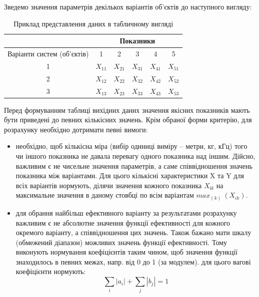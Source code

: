 Зведемо значення параметрів декількох варіантів об’єктів до наступного вигляду:

\begin{table}[!ht]
\centering
\caption{Приклад представлення даних в табличному вигляді}
\label{t:table_view_exapmle}
\begin{tabular}{c|c|c|c|c|c|}
\cline{2-6}
\multicolumn{1}{c|}{} & \multicolumn{5}{c|}{Показники} \\ \hline
\multicolumn{1}{|c|}{Варіанти систем (об’єктів)} & 1 & 2 & 3 & 4 & 5 \\ \hline
\multicolumn{1}{|c|}{1} & $X_{11} $ & $X_{21} $ & $X_{31} $ & $X_{41} $ & $X_{51} $  \\ \hline
\multicolumn{1}{|c|}{2} & $X_{12} $ & $X_{22} $ & $X_{32} $ & $X_{42} $ & $X_{52} $  \\ \hline
\multicolumn{1}{|c|}{3} & $X_{13} $ & $X_{23} $ & $X_{33} $ & $X_{43} $ & $X_{53} $  \\ \hline
\end{tabular}
\end{table}

Перед формуванням таблиці вихідних даних значення якісних показників мають бути приведені до певних
кількісних значень.  Крім обраної форми критерію, для розрахунку необхідно дотримати певні вимоги:

\begin{itemize}
\item необхідно, щоб кількісна міра (вибір одиниці виміру – метри, кг, кГц) того чи іншого показника
  не давала перевагу одного показника над іншим. Дійсно, важливим є не чисельне значення
  параметрів, а саме співвідношення значень показника між варіантами. Для цього кількісні
  характеристики X та Y для всіх варіантів нормують, ділячи значення кожного показника $X_{і k}$ на
  максимальне значення в даному стовбці по всім варіантам $max_{(k)}~(X_{ik})$.
\item для обрання найбільш ефективного варіанту за результатами розрахунку важливим є не абсолютне
  значення функції ефективності для кожного окремого варіанту, а співвідношення цих значень. Також
  бажано мати шкалу (обмежений діапазон) можливих значень функції ефективності. Тому виконують
  нормування коефіцієнтів таким чином, щоб значення функції знаходилось в певних межах, напр. від 0
  до 1 (за модулем). для цього вагові коефіцієнти нормують:
  \begin{equation}
    \label{eq:normal_factor}
    \displaystyle\sum_{i}|a_i| + \displaystyle\sum_{j}|b_j| = 1
  \end{equation}
\end{itemize}

